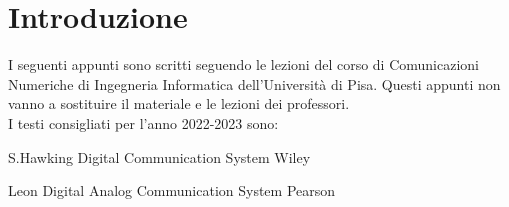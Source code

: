 \section{Introduzione}
I seguenti appunti sono scritti seguendo le lezioni del corso di Comunicazioni Numeriche 
di Ingegneria Informatica dell'Università di Pisa. Questi appunti non 
vanno a sostituire il materiale e le lezioni dei professori.\\
I testi consigliati per l'anno 2022-2023 sono:

S.Hawking Digital Communication System Wiley


Leon Digital Analog Communication System Pearson

